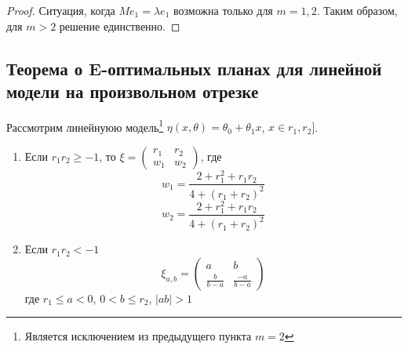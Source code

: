 \begin{proof}
Ситуация, когда $Me_1 = \lambda e_1$ возможна только для $m=1,2$. Таким образом, для $m > 2$ решение единственно. 
\end{proof}

\subsection{Теорема о E-оптимальных планах для линейной модели на произвольном отрезке}
Рассмотрим линейнуюю модель\footnote{Является исключением из предыдущего пункта $m=2$} $\eta(x, \theta) = \theta_0 + \theta_1 x$, $x \in r_1,r_2]$. 
\begin{thm}
\begin{enumerate}
\item Если $r_1r_2 \geq -1$, то $\xi = \begin{pmatrix} r_1 & r_2 \\ w_1 & w_2\end{pmatrix}$, где 
$$w_1 = \frac{2+r_1^2 + r_1r_2}{4+(r_1+r_2)^2}$$
$$ w_2 = \frac{2+r_1^2 + r_1r_2}{4+(r_1+r_2)^2}$$ 
\item Если $r_1r_2 < -1$
$$\xi_{a,b} = \begin{pmatrix} a & b \\ \frac{b}{b-a} & \frac{-a}{b-a} \end{pmatrix}$$
где $r_1 \leq a < 0$, $0 < b \leq r_2$, $|ab|> 1$
\end{enumerate}
\end{thm}
